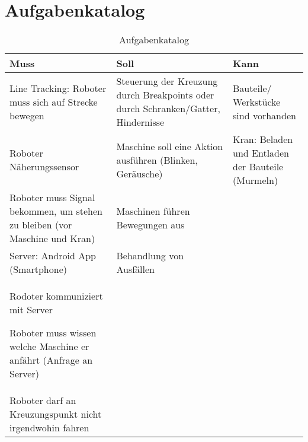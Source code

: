 \chapter{Aufgabenkatalog}
\label{ch:Aufgabenkatalog}

\begin{table}
	\centering
	\caption{Aufgabenkatalog}
	\label{tab:Aufgabenkatalogtable}
	\begin{tabular}{p{4.8cm}p{4.8cm}p{4.8cm}}
		\toprule
		Muss & Soll & Kann\\
		\midrule
		Line Tracking: Roboter muss sich auf Strecke bewegen 
		& Steuerung der Kreuzung durch Breakpoints
		oder durch Schranken/Gatter, Hindernisse 
		& Bauteile/ Werkstücke sind vorhanden\\		
		Roboter Näherungssensor 
		& Maschine soll eine Aktion ausführen (Blinken, Geräusche)
		& Kran: Beladen und Entladen der Bauteile (Murmeln)\\		
		Roboter muss Signal bekommen, um stehen zu bleiben (vor Maschine und Kran) 
		& Maschinen führen Bewegungen aus\\		
		Server: Android App (Smartphone) 
		& Behandlung von Ausfällen\\		
		Rodoter kommuniziert mit Server

 
		Roboter muss wissen welche Maschine er anfährt 
		(Anfrage an Server) \\		
		Roboter darf an Kreuzungspunkt nicht irgendwohin fahren \\ 
		\bottomrule
	\end{tabular}
\end{table}
